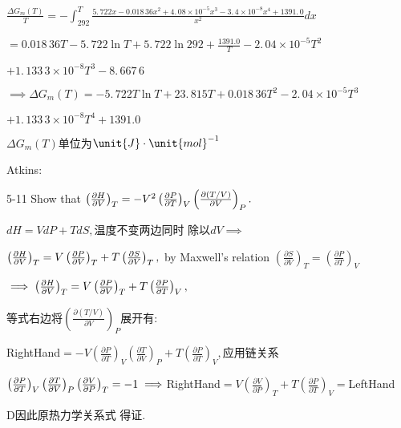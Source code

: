 \documentclass{article}
\begin{document}
$\frac{\Delta G_{m}\left( T\right) }{T}=-\int_{292}^{T}\frac{5.\,\allowbreak
722x-0.018\,36x^{2}+4.\,\allowbreak 08\times 10^{-5}x^{3}-3.\,\allowbreak
4\times 10^{-8}\allowbreak x^{4}+1391.\,\allowbreak 0}{x^{2}}dx$

$=\allowbreak 0.018\,36T-5.\,\allowbreak 722\ln T+5.\,\allowbreak 722\ln
292+\allowbreak \frac{1391.0}{T}-2.\,\allowbreak 04\times 10^{-5}T^{2}$

$+1.\,\allowbreak 133\,3\times 10^{-8}\allowbreak T^{3}-8.\,\allowbreak
667\,6$

$\implies \Delta G_{m}\left( T\right) =-5.\,\allowbreak 722\allowbreak T\ln
T+\allowbreak 23.\,\allowbreak 815T+0.018\,36T^{2}-2.\,\allowbreak 04\times
10^{-5}T^{3}$

$+1.\,\allowbreak 133\,3\times 10^{-8}T^{4}+\allowbreak 1391.0$

$\Delta G_{m}\left( T\right) $单位为$\unit{J}\cdot \unit{%
mol}^{-1}$

Atkins:

5-11 Show that $\left( \frac{\partial H}{\partial V}\right)
_{T}=-V^{2}\left( \frac{\partial P}{\partial T}\right) _{V}\left( \frac{%
\partial \left( T/V\right) }{\partial V}\right) _{P}.$

$dH=VdP+TdS,$温度不变两边同时%
除以$dV\implies $

$\left( \frac{\partial H}{\partial V}\right) _{T}=V\left( \frac{\partial P}{%
\partial V}\right) _{T}+T\left( \frac{\partial S}{\partial V}\right) _{T},$%
by Maxwell's relation $\left( \frac{\partial S}{\partial V}\right)
_{T}=\left( \frac{\partial P}{\partial T}\right) _{V}$

$\implies \left( \frac{\partial H}{\partial V}\right) _{T}=V\left( \frac{%
\partial P}{\partial V}\right) _{T}+T\left( \frac{\partial P}{\partial T}%
\right) _{V},$

等式右边将$\left( \frac{\partial \left(
T/V\right) }{\partial V}\right) _{P}$展开有:

\bigskip RightHand$=-V\left( \frac{\partial P}{\partial T}\right) _{V}\left( 
\frac{\partial T}{\partial V}\right) _{P}+T\left( \frac{\partial P}{\partial
T}\right) _{V},$应用链关系

$\left( \frac{\partial P}{\partial T}\right) _{V}\left( \frac{\partial T}{%
\partial V}\right) _{P}\left( \frac{\partial V}{\partial P}\right)
_{T}=-1\implies $RightHand$=V\left( \frac{\partial V}{\partial P}\right)
_{T}+T\left( \frac{\partial P}{\partial T}\right) _{V}=$LeftHand

D因此原热力学关系式%
得证.
\end{document}
